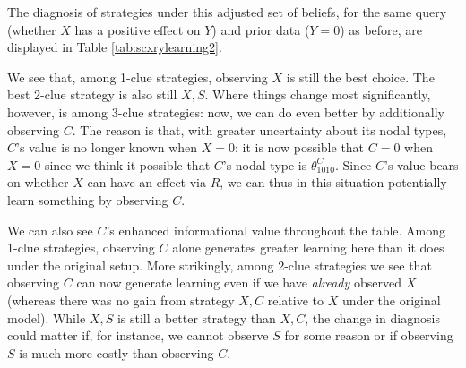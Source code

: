 \documentclass[
  12pt,
]{book}
\begin{document}
\begin{table}

\caption{\label{tab:scxrylearning2}Expected posterior variance from different clue selection strategies (less restricted model).}
\centering
{}
\end{table}

The diagnosis of strategies under this adjusted set of beliefs, for the same query (whether \(X\) has a positive effect on \(Y\)) and prior data (\(Y=0\)) as before, are displayed in Table \ref{tab:scxrylearning2}.

We see that, among 1-clue strategies, observing \(X\) is still the best choice. The best 2-clue strategy is also still \(X, S\). Where things change most significantly, however, is among 3-clue strategies: now, we can do even better by additionally observing \(C\). The reason is that, with greater uncertainty about its nodal types, \(C\)'s value is no longer known when \(X=0\): it is now possible that \(C=0\) when \(X=0\) since we think it possible that \(C\)'s nodal type is \(\theta^C_{1010}\). Since \(C\)'s value bears on whether \(X\) can have an effect via \(R\), we can thus in this situation potentially learn something by observing \(C\).

We can also see \(C\)'s enhanced informational value throughout the table. Among 1-clue strategies, observing \(C\) alone generates greater learning here than it does under the original setup. More strikingly, among 2-clue strategies we see that observing \(C\) can now generate learning even if we have \emph{already} observed \(X\) (whereas there was no gain from strategy \(X, C\) relative to \(X\) under the original model). While \(X, S\) is still a better strategy than \(X, C\), the change in diagnosis could matter if, for instance, we cannot observe \(S\) for some reason or if observing \(S\) is much more costly than observing \(C\).
\end{document}
